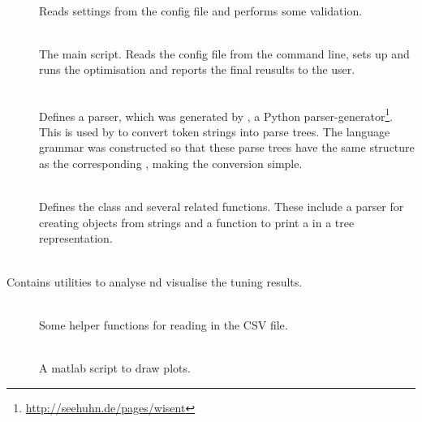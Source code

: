 \documentclass[a4paper, draft]{article}
\begin{document}
\begin{description}
\begin{description}
            \item[] \hfill\\
                Reads settings from the config file and performs 
                some validation.

            \item[] \hfill\\
                The main script. Reads the config file from the command line, 
                sets up and runs the optimisation and reports the final 
                reusults to the user.

            \item[] \hfill\\
                Defines a  parser, which was generated by  
                , a Python 
                parser-generator\footnote{\url{http://seehuhn.de/pages/wisent}}. 
                This is used by  to 
                convert token strings into parse trees. The language grammar 
                was constructed so that these parse trees have the same 
                structure as the corresponding , making the 
                conversion simple.

            \item[] \hfill\\
                Defines the  class and several related 
                functions. These include a parser for creating  
                objects from strings and a function to print a  
                in a tree representation.

        \end{description}
        
        
    \item[\filename{utilities/}] \hfill\\
        Contains utilities to analyse nd visualise the tuning results.
        
        \begin{description}
                \item[] \hfill\\
                    Some helper functions for reading in the CSV file.
                    
                \item[] \hfill\\
                    A matlab script to draw plots.
                    

\end{description}
\end{description}
\end{document}
